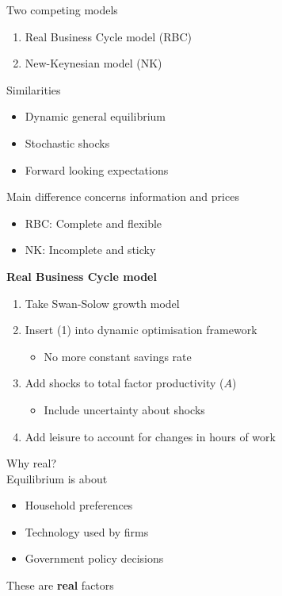 \documentclass{beamer}
\begin{document}
\begin{frame}
  Two competing models
  \begin{enumerate}
    \item Real Business Cycle model (RBC)
    \item New-Keynesian model (NK)
  \end{enumerate}
  \medskip
  Similarities
  \begin{itemize}
    \item Dynamic general equilibrium
    \item Stochastic shocks
    \item Forward looking expectations
  \end{itemize}
  \medskip
  Main difference concerns information and prices
  \begin{itemize}
    \item RBC: Complete and flexible 
    \item NK: Incomplete and sticky
  \end{itemize}
\end{frame}

\begin{frame}
  \textbf{Real Business Cycle model}\\
  \begin{enumerate}
    \item Take Swan-Solow growth model
    \item Insert (1) into dynamic optimisation framework
    \begin{itemize}
      \item No more constant savings rate
    \end{itemize}
    \item Add shocks to total factor productivity ($A$)
    \begin{itemize}
      \item Include uncertainty about shocks
    \end{itemize}
    \item Add leisure to account for changes in hours of work
  \end{enumerate}
\end{frame}

\begin{frame}
  Why real?\\
  \medskip
  Equilibrium is about
  \begin{itemize}
    \item Household preferences
    \item Technology used by firms
    \item Government policy decisions
  \end{itemize}
  \medskip
  These are \textbf{real} factors
\end{frame}
\end{document}
